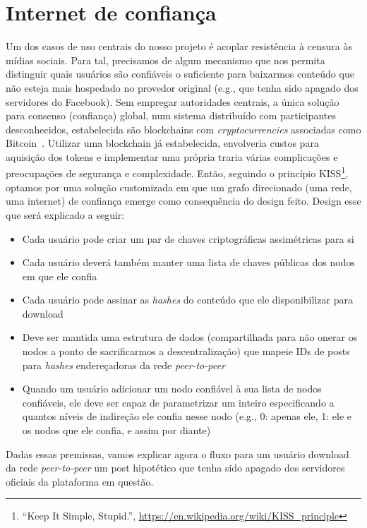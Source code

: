 \section{Internet de confiança}

Um dos casos de uso centrais do nosso projeto é acoplar resistência à censura às mídias sociais.
Para tal, precisamos de algum mecanismo que nos permita distinguir quais usuários são confiáveis o suficiente para baixarmos conteúdo que não esteja mais hospedado no provedor original (e.g., que tenha sido apagado dos servidores do Facebook).
Sem empregar autoridades centrais, a única solução para consenso (confiança) global, num sistema distribuído com participantes desconhecidos, estabelecida são blockchains com \textit{cryptocurrencies} associadas como Bitcoin~\cite{nakamoto2008bitcoin}.
Utilizar uma blockchain já estabelecida, envolveria custos para aquisição dos tokens e implementar uma própria traria várias complicações e preocupações de segurança e complexidade.
Então, seguindo o princípio KISS\footnote{``Keep It Simple, Stupid.'', \url{https://en.wikipedia.org/wiki/KISS_principle}}, optamos por uma solução customizada em que um grafo direcionado (uma rede, uma internet) de confiança emerge como consequência do design feito.
Design esse que será explicado a seguir:

\begin{itemize}
    \item Cada usuário pode criar um par de chaves criptográficas assimétricas para si
    \item Cada usuário deverá também manter uma lista de chaves públicas dos nodos em que ele confia
    \item Cada usuário pode assinar as \textit{hashes} do conteúdo que ele disponibilizar para download
    \item Deve ser mantida uma estrutura de dados (compartilhada para não onerar os nodos a ponto de sacrificarmos a descentralização) que mapeie IDs de posts para \textit{hashes} endereçadoras da rede \textit{peer-to-peer}
    \item Quando um usuário adicionar um nodo confiável à sua lista de nodos confiáveis, ele deve ser capaz de parametrizar um inteiro especificando a quantos níveis de indireção ele confia nesse nodo (e.g., 0: apenas ele, 1: ele e os nodos que ele confia, e assim por diante) 
\end{itemize}

Dadas essas premissas, vamos explicar agora o fluxo para um usuário download da rede \textit{peer-to-peer} um post hipotético que tenha sido apagado dos servidores oficiais da plataforma em questão.

